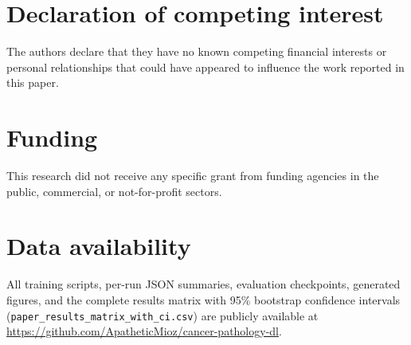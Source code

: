 \documentclass[preprint,12pt]{elsarticle}
\begin{document}
\section*{Declaration of competing interest}
The authors declare that they have no known competing financial interests or personal relationships that could have appeared to influence the work reported in this paper.

\section*{Funding}
This research did not receive any specific grant from funding agencies in the public, commercial, or not-for-profit sectors.

\section*{Data availability}
All training scripts, per-run JSON summaries, evaluation checkpoints, generated figures, and the complete results matrix with 95\% bootstrap confidence intervals (\texttt{paper\_results\_matrix\_with\_ci.csv}) are publicly available at \url{https://github.com/ApatheticMioz/cancer-pathology-dl}.



\end{document}
